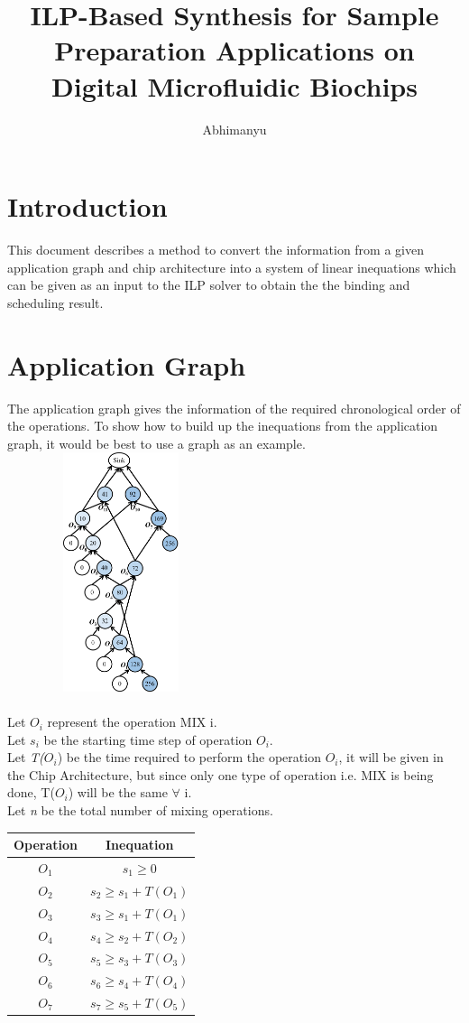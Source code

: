 \documentclass{article}
\title{ILP-Based Synthesis for Sample Preparation
Applications on Digital Microfluidic Biochips}
\author{Abhimanyu}
\begin{document}
\maketitle

\section{Introduction}
This document describes a method to convert the information from a given application graph
and chip architecture into a system of linear inequations which can be given as an input 
to the ILP solver to obtain the the binding and scheduling result.

\section{Application Graph}
The application graph gives the information of the required chronological order of the 
operations. To show how to build up the inequations from the application graph, it would 
be best to use a graph as an example.\\

\includegraphics[width=0.5\textwidth, height=7cm]{a4.png}\\\\
Let \emph{$O_i$} represent the operation MIX i.\\ 
Let \emph{$s_i$} be the starting time step of operation $O_i$. \\
Let \emph{T($O_i$}) be the time required to perform the operation $O_i$, 
it will be given in the Chip Architecture, but since only one type of
operation i.e. MIX is being done, T($O_i$) will be the same $\forall$ i.\\
Let \emph{n} be the total number of mixing operations.\\
\begin{center}
\begin{tabular}{|c|c|}  
\hline
Operation & Inequation\\
\hline
$O_1$ & $s_1\geq 0$\\
$O_2$ & $s_2\geq s_1 + T(O_1)$\\
$O_3$ & $s_3\geq s_1 + T(O_1)$\\
$O_4$ & $s_4\geq s_2 + T(O_2)$\\
$O_5$ & $s_5\geq s_3 + T(O_3)$\\
$O_6$ & $s_6\geq s_4 + T(O_4)$\\
$O_7$ & $s_7\geq s_5 + T(O_5)$\\
\hline
\end{tabular}
\end{center}
\end{document}
